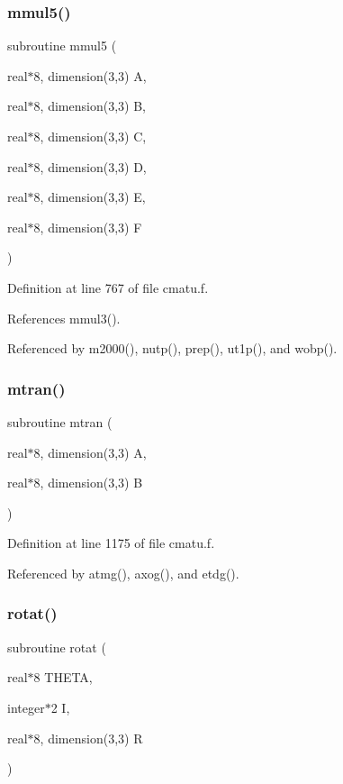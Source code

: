 \subsubsection{\texorpdfstring{mmul5()}{mmul5()}}
{\footnotesize\ttfamily subroutine mmul5 (\begin{DoxyParamCaption}\item[{real$\ast$8, dimension(3,3)}]{A,  }\item[{real$\ast$8, dimension(3,3)}]{B,  }\item[{real$\ast$8, dimension(3,3)}]{C,  }\item[{real$\ast$8, dimension(3,3)}]{D,  }\item[{real$\ast$8, dimension(3,3)}]{E,  }\item[{real$\ast$8, dimension(3,3)}]{F }\end{DoxyParamCaption})}



Definition at line 767 of file cmatu.\+f.



References mmul3().



Referenced by m2000(), nutp(), prep(), ut1p(), and wobp().

\mbox{\label{cmatu_8f_a625af018d14a86ef503ced306a1523a0}} 
\subsubsection{\texorpdfstring{mtran()}{mtran()}}
{\footnotesize\ttfamily subroutine mtran (\begin{DoxyParamCaption}\item[{real$\ast$8, dimension(3,3)}]{A,  }\item[{real$\ast$8, dimension(3,3)}]{B }\end{DoxyParamCaption})}



Definition at line 1175 of file cmatu.\+f.



Referenced by atmg(), axog(), and etdg().

\mbox{\label{cmatu_8f_a244b79ca75dda565e26ccbc7e6a27059}} 
\subsubsection{\texorpdfstring{rotat()}{rotat()}}
{\footnotesize\ttfamily subroutine rotat (\begin{DoxyParamCaption}\item[{real$\ast$8}]{T\+H\+E\+TA,  }\item[{integer$\ast$2}]{I,  }\item[{real$\ast$8, dimension(3,3)}]{R }\end{DoxyParamCaption})}



